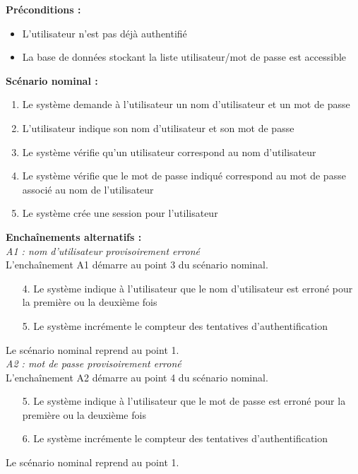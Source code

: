 \documentclass[12pt , a4paper]{article}
\begin{document}
\noindent\textbf{Préconditions :}
\begin{itemize}
\item L'utilisateur n'est pas déjà authentifié
\item La base de données stockant la liste utilisateur/mot de passe est accessible \\
\end{itemize}


\noindent\textbf{Scénario nominal :}
\begin{enumerate}
\item Le système demande à l'utilisateur un nom d'utilisateur et un mot de passe
\item L'utilisateur indique son nom d'utilisateur et son mot de passe
\item Le système vérifie qu'un utilisateur correspond au nom d'utilisateur
\item Le système vérifie que le mot de passe indiqué correspond au mot de passe associé au nom de l'utilisateur
\item Le système crée une session pour l'utilisateur \\
\end{enumerate}


\noindent\textbf{Encha\^inements alternatifs :}\\
\noindent\textit{A1 : nom d'utilisateur provisoirement erroné}\\
L'encha\^inement A1 démarre au point 3 du scénario nominal.
\begin{enumerate}
\item[4.] Le système indique à l'utilisateur que le nom d'utilisateur est erroné pour la première ou la deuxième fois
\item[5.] Le système incrémente le compteur des tentatives d'authentification
\end{enumerate}
Le scénario nominal reprend au point 1.\\


\noindent\textit{A2 : mot de passe provisoirement erroné}\\
L'encha\^inement A2 démarre au point 4 du scénario nominal.
\begin{enumerate}
\item[5.] Le système indique à l'utilisateur que le mot de passe est erroné pour la première ou la deuxième fois
\item[6.] Le système incrémente le compteur des tentatives d'authentification
\end{enumerate}
Le scénario nominal reprend au point 1.\\
\end{document}
